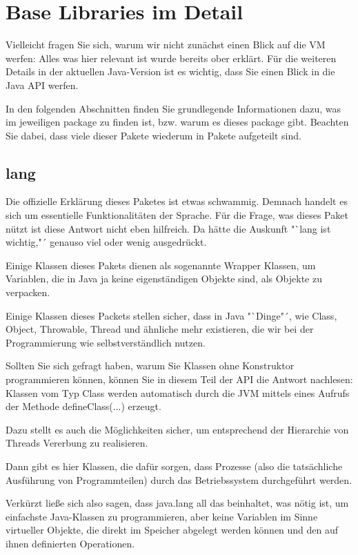 \section{Base Libraries im Detail}

Vielleicht fragen Sie sich, warum wir nicht zunächst einen Blick auf die VM werfen: Alles was hier relevant ist wurde bereits ober erklärt. Für die weiteren Details in der aktuellen Java-Version ist es wichtig, dass Sie einen Blick in die Java API werfen.

In den folgenden Abschnitten finden Sie grundlegende Informationen dazu, was im jeweiligen package zu finden ist, bzw. warum es dieses package gibt. Beachten Sie dabei, dass viele dieser Pakete wiederum in Pakete aufgeteilt sind.

\subsection{lang}

Die offizielle Erklärung dieses Paketes ist etwas schwammig. Demnach handelt es sich um essentielle Funktionalitäten der Sprache. Für die Frage, was dieses Paket nützt ist diese Antwort nicht eben hilfreich. Da hätte die Auskunft "`lang ist wichtig,"´ genauso viel oder wenig ausgedrückt.

Einige Klassen dieses Pakets dienen als sogenannte Wrapper Klassen, um Variablen, die in Java ja keine eigenständigen Objekte sind, als Objekte zu verpacken.

Einige Klassen dieses Packets stellen sicher, dass in Java "`Dinge"´, wie Class, Object, Throwable, Thread und ähnliche mehr existieren, die wir bei der Programmierung wie selbstverständlich nutzen.

Sollten Sie sich gefragt haben, warum Sie Klassen ohne Konstruktor programmieren können, können Sie in diesem Teil der API die Antwort nachlesen: Klassen vom Typ Class werden automatisch durch die JVM mittels eines Aufrufs der Methode defineClass(...) erzeugt.

Dazu stellt es auch die Möglichkeiten sicher, um entsprechend der Hierarchie von Threads Vererbung zu realisieren.

Dann gibt es hier Klassen, die dafür sorgen, dass Prozesse (also die tatsächliche Ausführung von Programmteilen) durch das Betriebssystem durchgeführt werden.

Verkürzt ließe sich also sagen, dass java.lang all das beinhaltet, was nötig ist, um einfachste Java-Klassen zu programmieren, aber keine Variablen im Sinne virtueller Objekte, die direkt im Speicher abgelegt werden können und den auf ihnen definierten Operationen.

